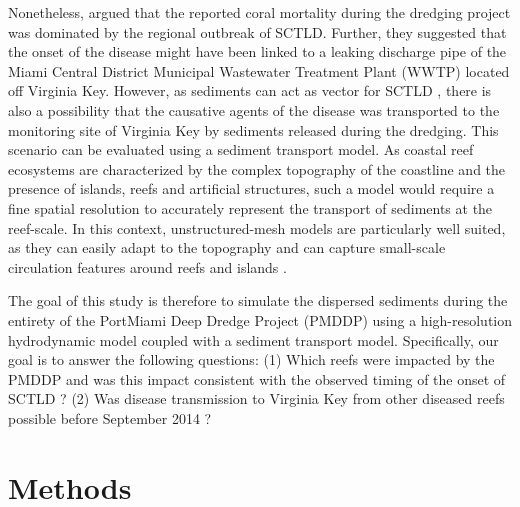 Nonetheless, \cite{gintert2019regional} argued that the reported coral mortality during the dredging project was dominated by the regional outbreak of SCTLD. Further, they suggested that the onset of the disease might have been linked to a leaking discharge pipe of the Miami Central District Municipal Wastewater Treatment Plant (WWTP) located off Virginia Key. However, as sediments can act as vector for SCTLD \citep{studivan2022reef}, there is also a possibility that the causative agents of the disease was transported to the monitoring site of Virginia Key by sediments released during the dredging. This scenario can be evaluated using a sediment transport model. As coastal reef ecosystems are characterized by the complex topography of the coastline and the presence of islands, reefs and artificial structures, such a model would require a fine spatial resolution to accurately represent the transport of sediments at the reef-scale. In this context, unstructured-mesh models are particularly well suited, as they can easily adapt to the topography \citep{fringer2019future} and can capture small-scale circulation features around reefs and islands \citep{lambrechts2008multi}.

The goal of this study is therefore to simulate the dispersed sediments during the entirety of the PortMiami Deep Dredge Project (PMDDP) using a high-resolution hydrodynamic model coupled with a sediment transport model. Specifically, our goal is to answer the following questions: (1) Which reefs were impacted by the PMDDP and was this impact consistent with the observed timing of the onset of SCTLD ?  (2) Was disease transmission to Virginia Key from other diseased reefs possible before September 2014 ? 

\section{Methods}


